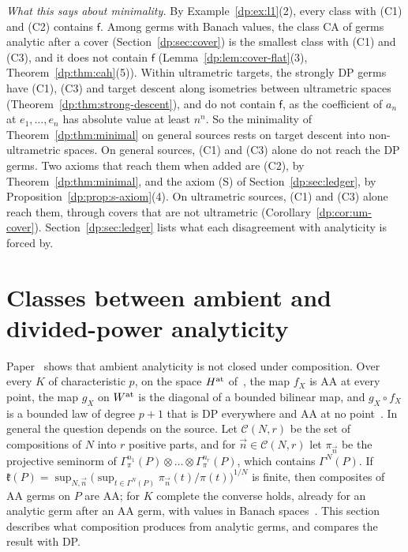 \documentclass[11pt]{amsart}
\theoremstyle{definition}
\theoremstyle{remark}
\numberwithin{equation}{section}
\theoremstyle{plain}
\theoremstyle{definition}
\theoremstyle{plain}
\begin{document}
\emph{What this says about minimality.} By Example~\ref{dp:ex:l1}(2), every class with (C1) and (C2) contains $\mathsf f$. Among germs with Banach values, the class CA of germs analytic after a cover (Section~\ref{dp:sec:cover}) is the smallest class with (C1) and (C3), and it does not contain $\mathsf f$ (Lemma~\ref{dp:lem:cover-flat}(3), Theorem~\ref{dp:thm:cah}(5)). Within ultrametric targets, the strongly DP germs have (C1), (C3) and target descent along isometries between ultrametric spaces (Theorem~\ref{dp:thm:strong-descent}), and do not contain $\mathsf f$, as the coefficient of $a_n$ at $e_1,\dots,e_n$ has absolute value at least $n^n$. So the minimality of Theorem~\ref{dp:thm:minimal} on general sources rests on target descent into non-ultrametric spaces. On general sources, (C1) and (C3) alone do not reach the DP germs. Two axioms that reach them when added are (C2), by Theorem~\ref{dp:thm:minimal}, and the axiom (S) of Section~\ref{dp:sec:ledger}, by Proposition~\ref{dp:prop:s-axiom}(4). On ultrametric sources, (C1) and (C3) alone reach them, through covers that are not ultrametric (Corollary~\ref{dp:cor:um-cover}). Section~\ref{dp:sec:ledger} lists what each disagreement with analyticity is forced by.
\section{Classes between ambient and divided-power analyticity}\label{dp:sec:chain}

Paper~\cite{I} shows that ambient analyticity is not closed under composition. Over every $K$ of characteristic $p$, on the space $H^{\rm at}$ of~\cite[Definition~14.16]{I}, the map $f_X$ is AA at every point, the map $g_X$ on $W^{\rm at}$ is the diagonal of a bounded bilinear map, and $g_X\circ f_X$ is a bounded law of degree $p+1$ that is DP everywhere and AA at no point~\cite[Theorem~14.17]{I}. In general the question depends on the source. Let $\mathcal C(N,r)$ be the set of compositions of $N$ into $r$ positive parts, and for $\vec n\in\mathcal C(N,r)$ let $\pi_{\vec n}$ be the projective seminorm of $\Gamma^{n_1}_\pi(P)\otimes\dots\otimes\Gamma^{n_r}_\pi(P)$, which contains $\Gamma^N(P)$. If $\mathfrak k(P)=\sup_{N,\vec n}\bigl(\sup_{t\in\Gamma^N(P)}\pi_{\vec n}(t)/\pi(t)\bigr)^{1/N}$ is finite, then composites of AA germs on $P$ are AA; for $K$ complete the converse holds, already for an analytic germ after an AA germ, with values in Banach spaces~\cite[Definition~14.21, Theorem~14.22]{I}. This section describes what composition produces from analytic germs, and compares the result with DP.
\end{document}
